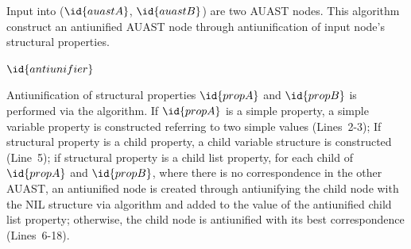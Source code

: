 \begin{algorithm}
 \caption{Input into ($\id{auastA}$, $\id{auastB}$) are two AUAST nodes. This algorithm construct an antiunified AUAST node through antiunification of input node's structural properties.}
  \label{AntiUnify}
  \begin{algorithmic}[1]
\AntiUnify
{}
	\Else
	\EndIf
\EndFor
{}
	
	\EndIf	
\EndFor
\Return $\id{antiunifier}$
\end{algorithmic}
\end{algorithm}

Antiunification of structural properties $\id{propA}$ and $\id{propB}$ is performed via the  algorithm. If $\id{propA}$ is a simple property, a simple variable property is constructed referring to two simple values (Lines~2-3); If structural property is a child property, a child variable structure is constructed (Line~5); if structural property is a child list property, for each child of $\id{propA}$ and $\id{propB}$, where there is no correspondence in the other AUAST, an antiunified node is created through antiunifying the child node with the NIL structure via  algorithm and added to the value of the antiunified child list property; otherwise, the child node is antiunified with its best correspondence (Lines~6-18).


